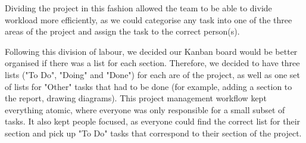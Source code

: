 \documentclass[titlepage]{article}
\begin{document}
Dividing the project in this fashion allowed the team to be able to divide workload more efficiently, as we could categorise any task into one of the three areas of the project and assign the task to the correct person(s).

Following this division of labour, we decided our Kanban board would be better organised if there was a list for each section. Therefore, we decided to have three lists ("To Do", "Doing" and "Done") for each are of the project, as well as one set of lists for "Other" tasks that had to be done (for example, adding a section to the report, drawing diagrams). This project management workflow kept everything atomic, where everyone was only responsible for a small subset of tasks. It also kept people focused, as everyone could find the correct list for their section and pick up "To Do" tasks that correspond to their section of the project.

\pagebreak
{}
 
\end{document}
